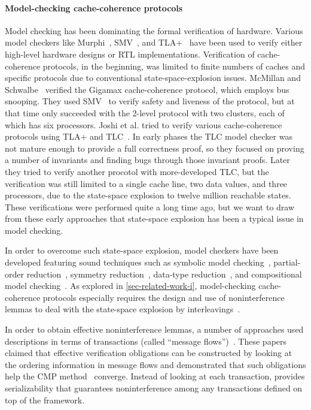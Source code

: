 \paragraph{Model-checking cache-coherence protocols}

Model checking has been dominating the formal verification of hardware.
Various model checkers like Murphi~\cite{murphi:Dill:1996,murphi:Dill:1992}, SMV~\cite{smv:McMillan:1993,smv:Jhala:2001}, and TLA+~\cite{tla:Lamport:2002} have been used to verify either high-level hardware designs or RTL implementations.
Verification of cache-coherence protocols, in the beginning, was limited to finite numbers of caches and specific protocols due to conventional state-space-explosion issues.
McMillan and Schwalbe~\cite{McMillan:1992} verified the Gigamax cache-coherence protocol, which employs bus snooping.
They used SMV~\cite{smv:McMillan:1993,smv:Jhala:2001} to verify safety and liveness of the protocol, but at that time only succeeded with the 2-level protocol with two clusters, each of which has six processors.
Joshi et al. tried to verify various cache-coherence protocols using TLA+ and TLC~\cite{tla:Lamport:2002}.
In early phases the TLC model checker was not mature enough to provide a full correctness proof, so they focused on proving a number of invariants and finding bugs through those invariant proofs.
Later they tried to verify another procotol with more-developed TLC, but the verification was still limited to a single cache line, two data values, and three processors, due to the state-space explosion to twelve million reachable states.
These verifications were performed quite a long time ago, but we want to draw from these early approaches that state-space explosion has been a typical issue in model checking.

In order to overcome such state-space explosion, model checkers have been developed featuring sound techniques such as symbolic model checking~\cite{thesis:McMillan:1992,smv:McMillan:1993}, partial-order reduction~\cite{Bhattacharya:2005}, symmetry reduction~\cite{Bhattacharya:2006,thesis:Ip:1996}, data-type reduction~\cite{McMillan:1999}, and compositional model checking~\cite{McMillan:1999}.
As explored in \autoref{sec-related-work-i}, model-checking cache-coherence protocols especially requires the design and use of noninterference lemmas to deal with the state-space explosion by interleavings~\cite{McMillan:1999,McMillan:2001,Chou:2004}.

In order to obtain effective noninterference lemmas, a number of approaches used descriptions in terms of transactions (called ``message flows'')~\cite{flow:Talupur:2008,flow:OLeary:2009,flow:Sethi:2014}.
These papers claimed that effective verification obligations can be constructed by looking at the ordering information in message flows and demonstrated that such obligations help the CMP method~\cite{McMillan:2001,Chou:2004} converge.
Instead of looking at each transaction, \hemiola{} provides serializability that guarantees noninterference among any transactions defined on top of the framework.

